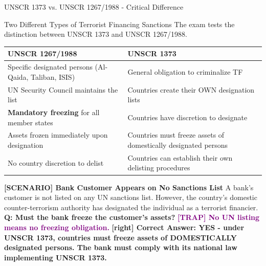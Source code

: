 \documentclass[11pt,a4paper]{beamer}
\newcommand{\trap}[1]{\textcolor{purple}{\textbf{[TRAP] #1}}}
\newcommand{\correct}[1]{\textcolor{green!50!black}{\textbf{[right] #1}}}
\newcommand{\scenario}[1]{\textcolor{blue!70!black}{\textbf{[SCENARIO] #1}}}
\begin{document}
\begin{frame}{UNSCR 1373 vs. UNSCR 1267/1988 - Critical Difference}
\begin{block}{Two Different Types of Terrorist Financing Sanctions}
The exam tests the distinction between UNSCR 1373 and UNSCR 1267/1988.
\end{block}
\begin{tabular}{p{}|p{}}
\hline
\rowcolor{lightgray}
\textbf{UNSCR 1267/1988} & \textbf{UNSCR 1373} \\
\hline
Specific designated persons (Al-Qaida, Taliban, ISIS) & General obligation to criminalize TF \\
UN Security Council maintains the list & Countries create their OWN designation lists \\
\textbf{Mandatory freezing} for all member states & Countries have discretion to designate \\
Assets frozen immediately upon designation & Countries must freeze assets of domestically designated persons \\
No country discretion to delist & Countries can establish their own delisting procedures \\
\hline
\end{tabular}
\scenario{Bank Customer Appears on No Sanctions List}
A bank's customer is not listed on any UN sanctions list. However, the country's domestic counter-terrorism authority has designated the individual as a terrorist financier.
\vspace{0.2cm}
\textbf{Q: Must the bank freeze the customer's assets?}
\trap{No UN listing means no freezing obligation.}
\correct{Correct Answer: YES - under UNSCR 1373, countries must freeze assets of DOMESTICALLY designated persons. The bank must comply with its national law implementing UNSCR 1373.}
\end{frame}

\end{document}
